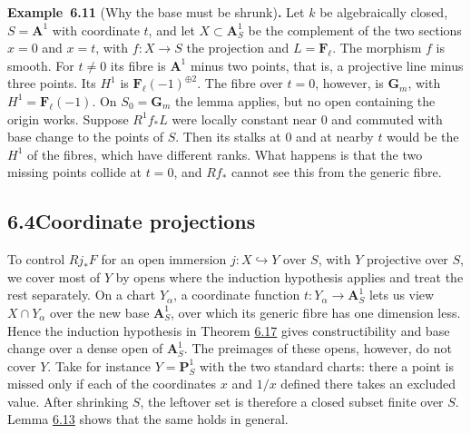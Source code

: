 \documentclass[11pt]{article}
\newenvironment{bpstatement}[2]{\par\addvspace{0.6\baselineskip}\noindent\textbf{#1}#2\textbf{.}\enspace\ignorespaces}
  {\par\addvspace{0.4\baselineskip}}
\providecommand{\Fell}{}\renewcommand{\Fell}{\mathbf F_\ell}
\begin{document}
\label{bp35}%
\begin{bpstatement}{Example~6.11}{ (Why the base must be shrunk)}
Let \(k\) be algebraically closed, \(S=\mathbf A^1\) with coordinate \(t\), and let \(X\subset\mathbf A^1_S\) be the complement of the two sections \(x=0\) and \(x=t\), with \(f:X\to S\) the projection and \(L=\Fell\). The morphism \(f\) is smooth. For \(t\neq0\) its fibre is \(\mathbf A^1\) minus two points, that is, a projective line minus three points. Its \(H^1\) is \(\Fell(-1)^{\oplus2}\). The fibre over \(t=0\), however, is \(\mathbf G_m\), with \(H^1=\Fell(-1)\). On \(S_0=\mathbf G_m\) the lemma applies, but no open containing the origin works. Suppose \(R^1f_*L\) were locally constant near \(0\) and commuted with base change to the points of \(S\). Then its stalks at \(0\) and at nearby \(t\) would be the \(H^1\) of the fibres, which have different ranks. What happens is that the two missing points collide at \(t=0\), and \(Rf_*\) cannot see this from the generic fibre.
\end{bpstatement}


\subsection*{\texorpdfstring{6.4\quad Coordinate projections}{6.4 Coordinate projections}}
\label{bp36}%
\label{bp37}%
To control \(Rj_*F\) for an open immersion \(j:X\hookrightarrow Y\) over \(S\), with \(Y\) projective over \(S\), we cover most of \(Y\) by opens where the induction hypothesis applies and treat the rest separately. On a chart \(Y_\alpha\), a coordinate function \(t:Y_\alpha\to\mathbf A^1_S\) lets us view \(X\cap Y_\alpha\) over the new base \(\mathbf A^1_S\), over which its generic fibre has one dimension less. Hence the induction hypothesis in Theorem \hyperref[bp51]{6.17} gives constructibility and base change over a dense open of \(\mathbf A^1_S\). The preimages of these opens, however, do not cover \(Y\). Take for instance \(Y=\mathbf P^1_S\) with the two standard charts: there a point is missed only if each of the coordinates \(x\) and \(1/x\) defined there takes an excluded value. After shrinking \(S\), the leftover set is therefore a closed subset finite over \(S\). Lemma \hyperref[bp41]{6.13} shows that the same holds in general.
\end{document}
